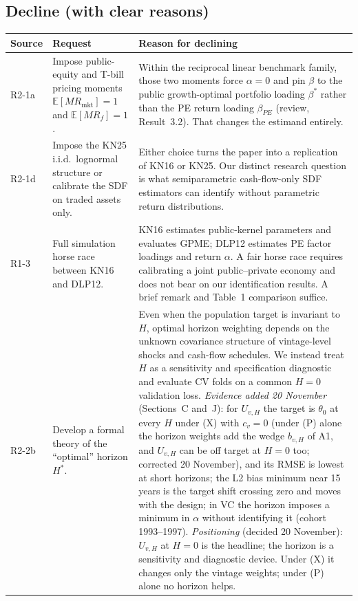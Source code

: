 \documentclass[11pt]{article}
\newcommand{\E}{\mathbb{E}}
\begin{document}
\subsection{Decline (with clear reasons)}

{\small
\begin{longtable}{@{}L{2.3cm}L{5.5cm}L{7.5cm}@{}}
\toprule
Source & Request & Reason for declining\\
\midrule
\endhead
R2-1a & Impose public-equity and T-bill pricing moments $\E[MR_{\mathrm{mkt}}]=1$ and $\E[MR_f]=1$. & Within the reciprocal linear benchmark family, those two moments force $\alpha=0$ and pin $\beta$ to the public growth-optimal portfolio loading $\beta^\ast$ rather than the PE return loading $\beta_{PE}$ (review, Result~3.2). That changes the estimand entirely.\\
R2-1d & Impose the KN25 i.i.d.\ lognormal structure or calibrate the SDF on traded assets only. & Either choice turns the paper into a replication of KN16 or KN25. Our distinct research question is what semiparametric cash-flow-only SDF estimators can identify without parametric return distributions.\\
R1-3 & Full simulation horse race between KN16 and DLP12. & KN16 estimates public-kernel parameters and evaluates GPME; DLP12 estimates PE factor loadings and return $\alpha$. A fair horse race requires calibrating a joint public--private economy and does not bear on our identification results. A brief remark and Table~1 comparison suffice.\\
R2-2b & Develop a formal theory of the ``optimal'' horizon $H^\ast$. & Even when the population target is invariant to $H$, optimal horizon weighting depends on the unknown covariance structure of vintage-level shocks and cash-flow schedules. We instead treat $H$ as a sensitivity and specification diagnostic and evaluate CV folds on a common $H=0$ validation loss. \emph{Evidence added 20 November} (Sections~C and~J): for $U_{v,H}$ the target is $\theta_0$ at every $H$ under (X) with $c_v=0$ (under (P) alone the horizon weights add the wedge $b_{v,H}$ of A1, and $U_{v,H}$ can be off target at $H=0$ too; corrected 20 November), and its RMSE is lowest at short horizons; the L2 bias minimum near 15 years is the target shift crossing zero and moves with the design; in VC the horizon imposes a minimum in $\alpha$ without identifying it (cohort 1993--1997). \emph{Positioning} (decided 20 November): $U_{v,H}$ at $H=0$ is the headline; the horizon is a sensitivity and diagnostic device. Under (X) it changes only the vintage weights; under (P) alone no horizon helps.\\

\end{longtable}}
\end{document}
